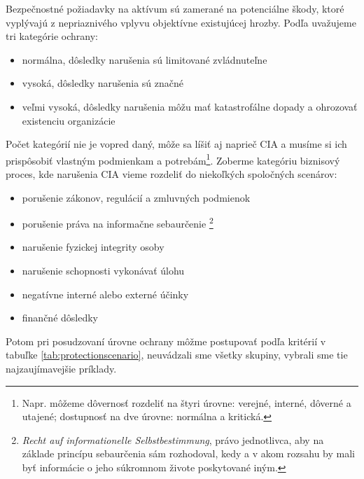 Bezpečnostné požiadavky na aktívum sú zamerané na potenciálne škody, ktoré vyplývajú z nepriaznivého vplyvu objektívne existujúcej hrozby. Podľa
\cite{BSI3} uvažujeme tri kategórie ochrany:
\begin{itemize}[nosep]
    \item normálna, dôsledky narušenia sú limitované zvládnuteľne 
    \item vysoká, dôsledky narušenia sú značné
    \item veľmi vysoká, dôsledky narušenia môžu mať katastrofálne dopady a ohrozovať existenciu organizácie 
\end{itemize}
Počet kategórií nie je vopred daný, môže sa líšiť aj naprieč CIA a musíme si ich prispôsobiť vlastným podmienkam a potrebám\footnote{Napr. môžeme
dôvernosť rozdeliť na štyri úrovne: verejné, interné, dôverné a utajené; dostupnosť na dve úrovne: normálna a kritická.}. Zoberme kategóriu
biznisový proces, kde narušenia CIA vieme rozdeliť do niekoľkých spoločných scenárov:
\begin{itemize}[nosep]
    \item porušenie zákonov, regulácií a zmluvných podmienok
    \item porušenie práva na informačne sebaurčenie \footnote{\emph{Recht auf informationelle Selbstbestimmung},
    právo jednotlivca, aby na základe princípu sebaurčenia sám rozhodoval, kedy a v akom rozsahu by mali byť
    informácie o jeho súkromnom živote poskytované iným.}
    \item narušenie fyzickej integrity osoby
    \item narušenie schopnosti vykonávať úlohu
    \item negatívne interné alebo externé účinky
    \item finančné dôsledky
\end{itemize}
Potom pri posudzovaní úrovne ochrany môžme postupovať podľa kritérií v tabuľke \ref{tab:protectionscenario}, neuvádzali sme všetky skupiny, vybrali sme
tie najzaujímavejšie príklady.


